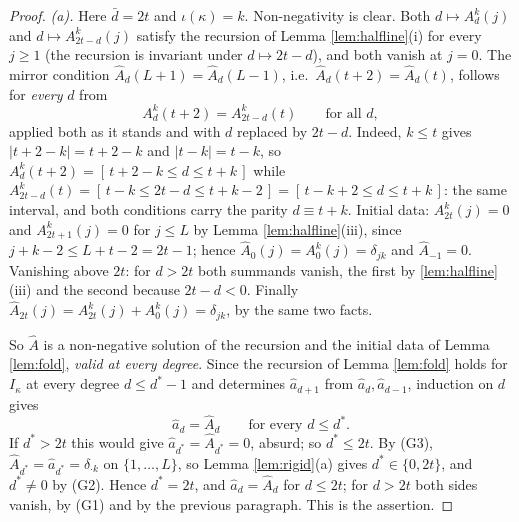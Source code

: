 \documentclass[reqno]{amsart}
\theoremstyle{plain}
\theoremstyle{definition}
\newcommand{\ka}{\kappa}
\begin{document}
\begin{proof}
\emph{(a).}  Here $\bar d=2t$ and $\iota(\ka)=k$.  Non-negativity is clear.
Both $d\mapsto A^{k}_d(j)$ and $d\mapsto A^{k}_{2t-d}(j)$ satisfy the
recursion of Lemma \ref{lem:halfline}(i) for every $j\ge1$ (the recursion is
invariant under $d\mapsto2t-d$), and both vanish at $j=0$.  The mirror
condition $\hat A_d(L+1)=\hat A_d(L-1)$, i.e.\ $\hat A_d(t+2)=\hat A_d(t)$,
follows for \emph{every} $d$ from
\begin{equation}\label{eq:mirror}
   A^{k}_d(t+2)=A^{k}_{2t-d}(t)\qquad\text{for all }d,
\end{equation}
applied both as it stands and with $d$ replaced by $2t-d$.  Indeed, $k\le t$
gives $|t+2-k|=t+2-k$ and $|t-k|=t-k$, so
$A^{k}_d(t+2)=[\,t+2-k\le d\le t+k\,]$ while
$A^{k}_{2t-d}(t)=[\,t-k\le2t-d\le t+k-2\,]=[\,t-k+2\le d\le t+k\,]$: the same
interval, and both conditions carry the parity $d\equiv t+k$.  Initial data:
$A^{k}_{2t}(j)=0$ and $A^{k}_{2t+1}(j)=0$ for $j\le L$ by Lemma
\ref{lem:halfline}(iii), since $j+k-2\le L+t-2=2t-1$; hence
$\hat A_0(j)=A^{k}_0(j)=\delta_{jk}$ and $\hat A_{-1}=0$.  Vanishing above
$2t$: for $d>2t$ both summands vanish, the first by
\ref{lem:halfline}(iii) and the second because $2t-d<0$.  Finally
$\hat A_{2t}(j)=A^{k}_{2t}(j)+A^{k}_{0}(j)=\delta_{jk}$, by the same two
facts.

So $\hat A$ is a non-negative solution of the recursion and the initial data
of Lemma \ref{lem:fold}, \emph{valid at every degree}.  Since the recursion
of Lemma \ref{lem:fold} holds for $I_\ka$ at every degree $d\le d^{*}-1$ and
determines $\hat a_{d+1}$ from $\hat a_d,\hat a_{d-1}$, induction on $d$
gives
\[
   \hat a_d=\hat A_d\qquad\text{for every } d\le d^{*}.
\]
If $d^{*}>2t$ this would give $\hat a_{d^{*}}=\hat A_{d^{*}}=0$, absurd; so
$d^{*}\le2t$.  By (G3), $\hat A_{d^{*}}=\hat a_{d^{*}}=\delta_{\cdot k}$ on
$\{1,\dots,L\}$, so Lemma \ref{lem:rigid}(a) gives $d^{*}\in\{0,2t\}$, and
$d^{*}\ne0$ by (G2).  Hence $d^{*}=2t$, and $\hat a_d=\hat A_d$ for
$d\le2t$; for $d>2t$ both sides vanish, by (G1) and by the previous
paragraph.  This is the assertion.


\end{proof}
\end{document}
